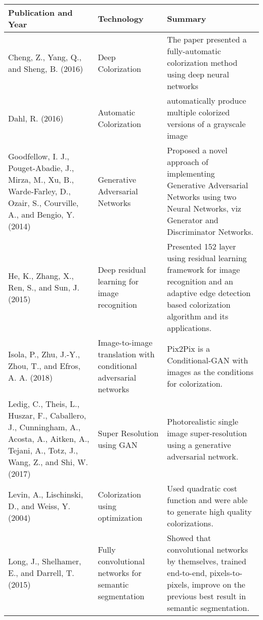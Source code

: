 \documentclass[12pt]{article}
\begin{document}
  \begin{tabularx}{\textwidth}{| X | X | X | } \hline
\textbf{Publication and Year} &	 \textbf{Technology} & \textbf{Summary} \\ \hline
Cheng, Z., Yang, Q., and Sheng, B. (2016) &	Deep Colorization &	 The paper presented a fully-automatic colorization method using deep neural networks\\ \hline

Dahl, R. (2016) &	Automatic Colorization & automatically produce multiple colorized versions of a grayscale image\\ \hline

Goodfellow, I. J., Pouget-Abadie, J., Mirza, M., Xu, B., Warde-Farley, D., Ozair, S., Courville, A., and Bengio, Y. (2014) & Generative Adversarial Networks & Proposed a novel approach of implementing Generative Adversarial Networks using two Neural Networks, viz Generator and Discriminator Networks.\\ \hline

He, K., Zhang, X., Ren, S., and Sun, J. (2015) & Deep residual learning for image recognition & Presented 152 layer using residual learning framework for image recognition and an adaptive edge detection based colorization algorithm and its applications.\\ \hline

Isola, P., Zhu, J.-Y., Zhou, T., and Efros, A. A. (2018) & Image-to-image translation with conditional adversarial networks &  Pix2Pix is a Conditional-GAN with images as the conditions for colorization.\\ \hline
Ledig, C., Theis, L., Huszar, F., Caballero, J., Cunningham, A., Acosta, A., Aitken, A., Tejani, A., Totz, J., Wang, Z., and Shi, W. (2017) &  Super Resolution using GAN & Photorealistic single image super-resolution using a generative adversarial network.\\ \hline

Levin, A., Lischinski, D., and Weiss, Y. (2004) &  Colorization using optimization & Used quadratic cost function and were able to generate high quality colorizations. \\ \hline

Long, J., Shelhamer, E., and Darrell, T. (2015) &  Fully convolutional networks for semantic segmentation &  Showed that convolutional networks by themselves, trained end-to-end, pixels-to-pixels, improve on the previous best result in semantic segmentation.\\ \hline

\end{tabularx}
\end{document}
